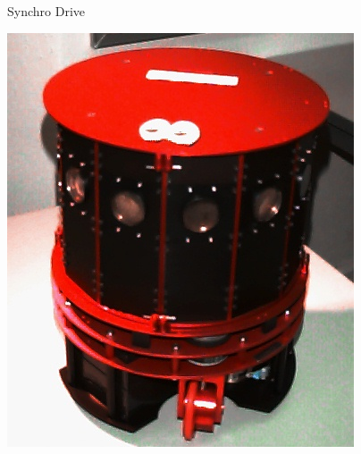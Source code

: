 \documentclass[compress]{beamer}
\begin{document}
\begin{frame}{Synchro Drive}
\begin{center}
        \includegraphics[height=0.4\paperheight]{synchrodrive_ex1}
        \hspace{1em}

\end{center}
\end{frame}
\end{document}
